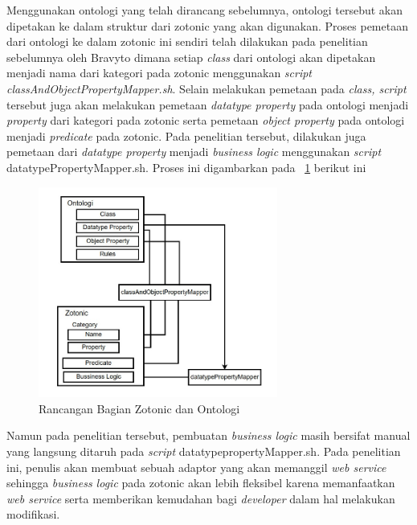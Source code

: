 Menggunakan ontologi yang telah dirancang sebelumnya, ontologi tersebut akan dipetakan ke dalam struktur dari zotonic yang akan digunakan. Proses pemetaan dari ontologi ke dalam zotonic ini sendiri telah dilakukan pada penelitian sebelumnya oleh Bravyto dimana setiap \textit{class} dari ontologi akan dipetakan menjadi nama dari kategori pada zotonic menggunakan \textit{script classAndObjectPropertyMapper.sh}. Selain melakukan pemetaan pada \textit{class, script} tersebut juga akan melakukan pemetaan \textit{datatype property} pada ontologi menjadi \textit{property} dari kategori pada zotonic serta pemetaan \textit{object property} pada ontologi menjadi \textit{predicate} pada zotonic. Pada penelitian tersebut, dilakukan juga pemetaan dari \textit{datatype property} menjadi \textit{business logic} menggunakan \textit{script} datatypePropertyMapper.sh. Proses ini digambarkan pada \pic~\ref{fig:ZotonicRoadmap} berikut ini

\begin{figure}
	\centering
	\includegraphics[width=0.7\textwidth]
	{pics/partZotonicRoadmap.jpg}
	\caption{Rancangan Bagian Zotonic dan Ontologi}
	\label{fig:ZotonicRoadmap}
\end{figure}
\vspace{-0.3cm}

Namun pada penelitian tersebut, pembuatan \textit{business logic} masih bersifat manual yang langsung ditaruh pada \textit{script} datatypepropertyMapper.sh. Pada penelitian ini, penulis akan membuat sebuah adaptor yang akan memanggil \textit{web service} sehingga \textit{business logic} pada zotonic akan lebih fleksibel karena memanfaatkan \textit{web service} serta memberikan kemudahan bagi \textit{developer} dalam hal melakukan modifikasi.
